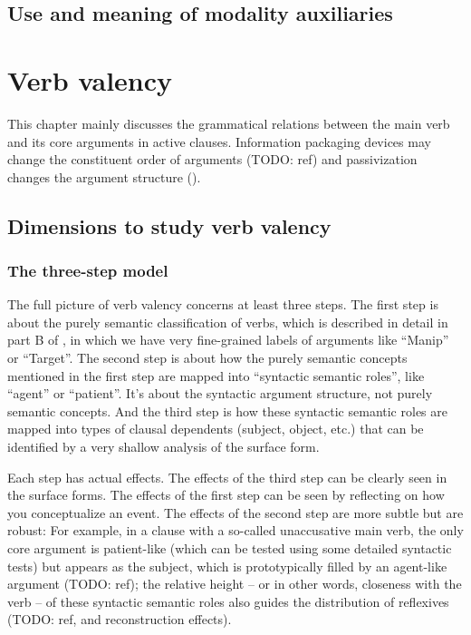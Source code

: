 \documentclass[UTF8, a4paper, oneside, scheme=plain]{ctexrep}
\begin{document}
\section{Use and meaning of modality auxiliaries}\label{sec:verb-inflection.modal-use}


\chapter{Verb valency}

This chapter mainly discusses the grammatical relations between the main verb and its core arguments 
in active clauses.
Information packaging devices may change the constituent order of arguments (TODO: ref)
and passivization changes the argument structure (). 

\section{Dimensions to study verb valency}\label{sec:valency.overview}

\subsection{The three-step model}\label{sec:valency.overview.steps}

The full picture of verb valency concerns at least three steps.
The first step is about the purely semantic classification of verbs,
which is described in detail in part B of \citet{dixon2005semantic},
in which we have very fine-grained labels of arguments like ``Manip'' or ``Target''.
The second step is about how the purely semantic concepts mentioned in the first step 
are mapped into ``syntactic semantic roles'',
like ``agent'' or ``patient''.
It's about the syntactic argument structure, 
not purely semantic concepts.
And the third step is how these syntactic semantic roles are mapped into 
types of clausal dependents (subject, object, etc.) 
that can be identified by a very shallow analysis of the surface form.

Each step has actual effects.
The effects of the third step can be clearly seen in the surface forms.
The effects of the first step can be seen by reflecting on how you conceptualize an event.
The effects of the second step are more subtle but are robust:
For example, in a clause with a so-called unaccusative main verb,
the only core argument is patient-like (which can be tested using some detailed syntactic tests)
but appears as the subject,
which is prototypically filled by an agent-like argument (TODO: ref);
the relative height -- or in other words, closeness with the verb -- of these syntactic semantic roles 
also guides the distribution of reflexives (TODO: ref, and reconstruction effects).
\end{document}
